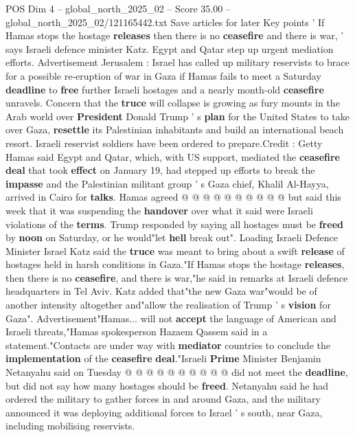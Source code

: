 \begin{textsample}{POS Dim 4 – global\_north\_2025\_02 – Score 35.00 – global\_north\_2025\_02/121165442.txt}  \label{ex:f4_pos_052}
Save articles for later Key points ' If Hamas stops the hostage \textbf{releases} then there is no \textbf{ceasefire} and there is war, ' says Israeli defence minister Katz.
Egypt and Qatar step up urgent mediation efforts.
Advertisement Jerusalem : Israel has called up military reservists to brace for a possible re-eruption of war in Gaza if Hamas fails to meet a Saturday \textbf{deadline} to \textbf{free} further Israeli hostages and a nearly month-old \textbf{ceasefire} unravels.
Concern that the \textbf{truce} will collapse is growing as fury mounts in the Arab world over \textbf{President} Donald Trump ' s \textbf{plan} for the United States to take over Gaza, \textbf{resettle} its Palestinian inhabitants and build an international beach resort.
Israeli reservist soldiers have been ordered to prepare.Credit : Getty Hamas said Egypt and Qatar, which, with US support, mediated the \textbf{ceasefire} \textbf{deal} that took \textbf{effect} on January 19, had stepped up efforts to break the \textbf{impasse} and the Palestinian militant group ' s Gaza chief, Khalil Al-Hayya, arrived in Cairo for \textbf{talks}.
Hamas agreed @ @ @ @ @ @ @ @ @ @ but said this week that it was suspending the \textbf{handover} over what it said were Israeli violations of the \textbf{terms}.
Trump responded by saying all hostages must be \textbf{freed} by \textbf{noon} on Saturday, or he would"let \textbf{hell} break out".
Loading Israeli Defence Minister Israel Katz said the \textbf{truce} was meant to bring about a swift \textbf{release} of hostages held in harsh conditions in Gaza."If Hamas stops the hostage \textbf{releases}, then there is no \textbf{ceasefire}, and there is war,"he said in remarks at Israeli defence headquarters in Tel Aviv.
Katz added that"the new Gaza war"would be of another intensity altogether and"allow the realisation of Trump ' s \textbf{vision} for Gaza".
Advertisement"Hamas... will not \textbf{accept} the language of American and Israeli threats,"Hamas spokesperson Hazaem Qassem said in a statement."Contacts are under way with \textbf{mediator} countries to conclude the \textbf{implementation} of the \textbf{ceasefire} \textbf{deal}."Israeli \textbf{Prime} Minister Benjamin Netanyahu said on Tuesday @ @ @ @ @ @ @ @ @ @ did not meet the \textbf{deadline}, but did not say how many hostages should be \textbf{freed}.
Netanyahu said he had ordered the military to gather forces in and around Gaza, and the military announced it was deploying additional forces to Israel ' s south, near Gaza, including mobilising reservists.

\end{textsample}
